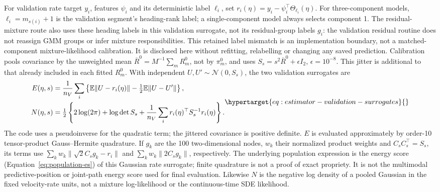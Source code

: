For validation rate target \(y_i\), features \(\psi_i\) and its deterministic
label \(\ell_i\), set \(r_i(\eta)=y_i-\psi_i^\top\Theta_{\ell_i}(\eta)\).
For three-component models, \(\ell_i=m_{s(i)}+1\) is the validation
segment's heading-rank label; a single-component model always selects
component 1. The residual-mixture route also uses these heading labels in
this validation surrogate, not its residual-group labels \(g_i\): the
validation residual routine does not reassign GMM groups or infer mixture
responsibilities. This retained label mismatch is an implementation boundary,
not a matched-component mixture-likelihood calibration. It is disclosed here
without refitting, relabelling or changing any saved prediction.
Calibration pools covariance by the unweighted mean
\(\overline R^0=M^{-1}\sum_mR_m^0\), not by \(\pi_m^0\), and uses
\(S_s=s^2\overline R^0+\epsilon I_2\), \(\epsilon=10^{-8}\).
This jitter is additional to that already included in each fitted \(R_m^0\).
With independent \(U,U'\sim\mathcal N(0,S_s)\), the two validation surrogates
are
\begin{equation}
\begin{aligned}
E(\eta,s)&=\frac1{n_V}\sum_i
 \left\{\mathbb E\|U-r_i(\eta)\|-\tfrac12\mathbb E\|U-U'\|\right\},\\
N(\eta,s)&=\tfrac12\left\{2\log(2\pi)+\log\det S_s
 +\frac1{n_V}\sum_i r_i(\eta)^\top S_s^{-1}r_i(\eta)\right\}.
\end{aligned}
\label{eq:estimator-validation-surrogates}\hypertarget{eq:estimator-validation-surrogates}{}
\end{equation}
The code uses a pseudoinverse for the quadratic term; the jittered covariance
is positive definite. \(E\) is evaluated approximately by order-10
tensor-product Gauss--Hermite quadrature. If \(g_k\) are the 100 two-dimensional
nodes, \(w_k\) their normalized product weights and \(C_sC_s^\top=S_s\),
its terms use \(\sum_kw_k\|\sqrt2C_sg_k-r_i\|\) and
\(\sum_kw_k\|2C_sg_k\|\), respectively.
The underlying population expression is the energy score
(Equation~\eqref{eq:population-es}) of this Gaussian rate surrogate;
finite quadrature is not a proof of exact propriety.
It is not the multimodal predictive-position or joint-path energy score
used for final evaluation. Likewise \(N\) is the negative log density of
a pooled Gaussian in the fixed velocity-rate units, not a mixture
log-likelihood or the continuous-time SDE likelihood.

